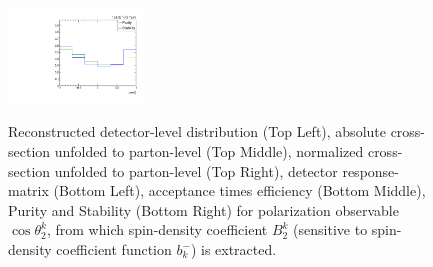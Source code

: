\begin{figure}[htb]
\begin{center}
 \includegraphics[width=0.32\textwidth]{fig_fullRun2UL/unfolding/combined/PurStab_b2k.pdf} \\
\caption{Reconstructed detector-level distribution (Top Left), absolute cross-section unfolded to parton-level (Top Middle), normalized cross-section unfolded to parton-level (Top Right), detector response-matrix (Bottom Left), acceptance times efficiency (Bottom Middle), Purity and Stability (Bottom Right) for polarization observable $\cos\theta_{2}^{k}$, from which spin-density coefficient $B_{2}^{k}$ (sensitive to spin-density coefficient function $b_k^{-}$) is extracted.}
\label{fig:b2k}
\end{center}
\end{figure}
\clearpage
